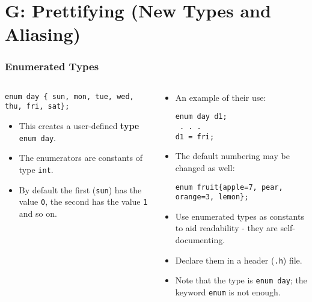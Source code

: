 \section{G: Prettifying (New Types and Aliasing)}

\begin{frame}[fragile]
\frametitle{Enumerated Types}
\begin{columns}
\begin{column}{0.45\textwidth}
{\small
\begin{verbatim}
enum day { sun, mon, tue, wed, thu, fri, sat};
\end{verbatim}
}

\begin{itemize}[<+->]
\item This creates a user-defined {\bf type} \verb^enum day^.
\item The enumerators are constants of type \verb^int^.
\item By default the first (\verb^sun^) has the value \verb^0^,
the second has the value \verb^1^ and so on.
\end{itemize}
\end{column}

\begin{column}{0.45\textwidth}
\begin{itemize}[<+->]
\item An example of their use:
\begin{verbatim}
enum day d1;
 . . .
d1 = fri;
\end{verbatim}
\item The default numbering may be changed as well:
{\small
\begin{verbatim}
enum fruit{apple=7, pear, orange=3, lemon};
\end{verbatim}
}
\item Use enumerated types as constants to aid readability -
they are self-documenting.
\item Declare them in a header (\verb^.h^) file.
\item Note that the type is \verb^enum day^; the
keyword \verb^enum^ is not enough.
\end{itemize}
\end{column}


\end{columns}
\end{frame}

